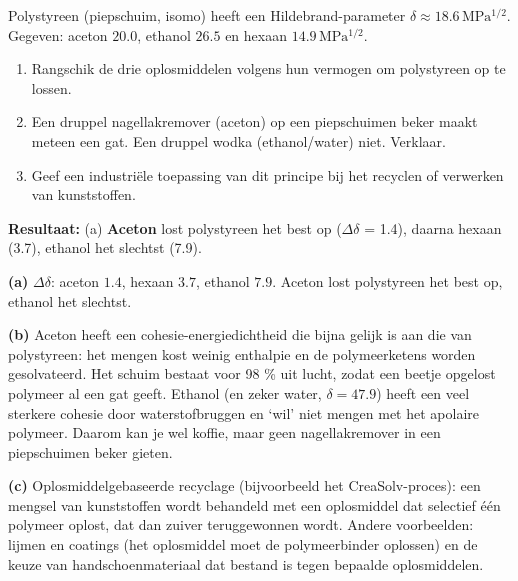 \begin{oefening}
Polystyreen (piepschuim, isomo) heeft een Hildebrand-parameter \(\delta \approx 18.6\,\mathrm{MPa^{1/2}}\). Gegeven: aceton \(20.0\), ethanol \(26.5\) en hexaan \(14.9\,\mathrm{MPa^{1/2}}\).

\begin{enumerate}
\item[(a)]
  Rangschik de drie oplosmiddelen volgens hun vermogen om polystyreen op te lossen.
\item[(b)]
  Een druppel nagellakremover (aceton) op een piepschuimen beker maakt meteen een gat. Een druppel wodka (ethanol/water) niet. Verklaar.
\item[(c)]
  Geef een industriële toepassing van dit principe bij het recyclen of verwerken van kunststoffen.
\end{enumerate}
\end{oefening}
\begin{oplossing}
\textbf{Resultaat:} (a) \textbf{Aceton} lost polystyreen het best op (\(\Delta\delta\) = 1.4), daarna hexaan (3.7), ethanol het slechtst (7.9).

\textbf{(a)} \(\Delta\delta\): aceton \(1.4\), hexaan \(3.7\), ethanol \(7.9\). Aceton lost polystyreen het best op, ethanol het slechtst.

\textbf{(b)} Aceton heeft een cohesie-energiedichtheid die bijna gelijk is aan die van polystyreen: het mengen kost weinig enthalpie en de polymeerketens worden gesolvateerd. Het schuim bestaat voor 98 \% uit lucht, zodat een beetje opgelost polymeer al een gat geeft. Ethanol (en zeker water, \(\delta = 47.9\)) heeft een veel sterkere cohesie door waterstofbruggen en `wil' niet mengen met het apolaire polymeer. Daarom kan je wel koffie, maar geen nagellakremover in een piepschuimen beker gieten.

\textbf{(c)} Oplosmiddelgebaseerde recyclage (bijvoorbeeld het CreaSolv-proces): een mengsel van kunststoffen wordt behandeld met een oplosmiddel dat selectief één polymeer oplost, dat dan zuiver teruggewonnen wordt. Andere voorbeelden: lijmen en coatings (het oplosmiddel moet de polymeerbinder oplossen) en de keuze van handschoenmateriaal dat bestand is tegen bepaalde oplosmiddelen.
\end{oplossing}

